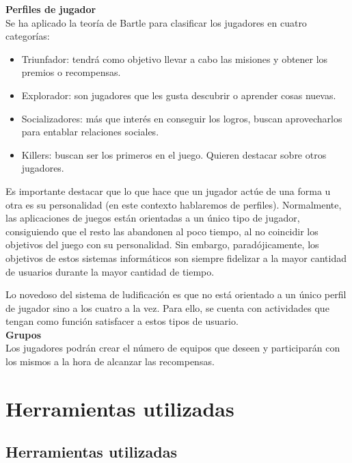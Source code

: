 \documentclass[twoside]{report}
\begin{document}
\textbf{Perfiles de jugador\cite{iebsctj}}\\ 

Se ha aplicado la teoría de Bartle para clasificar los jugadores en cuatro categorías:
\begin{itemize}

\item Triunfador: tendrá como objetivo llevar a cabo las misiones y obtener los premios o recompensas.
\item Explorador: son jugadores que les gusta descubrir o aprender cosas nuevas.
\item Socializadores: más que interés en conseguir los logros, buscan aprovecharlos para entablar relaciones sociales.
\item Killers: buscan ser los primeros en el juego. Quieren destacar sobre otros jugadores.

\end{itemize}

Es importante destacar que lo que hace que un jugador actúe de una forma u otra es su personalidad (en este contexto hablaremos de perfiles). Normalmente, las aplicaciones de juegos están orientadas a un único tipo de jugador, consiguiendo que el resto las abandonen al poco tiempo, al no coincidir los objetivos del juego con su personalidad. Sin embargo, paradójicamente, los objetivos de estos sistemas informáticos son siempre fidelizar a la mayor cantidad de usuarios durante la mayor cantidad de tiempo.

Lo novedoso del sistema de ludificación es que no está orientado a un único perfil de jugador sino a los cuatro a la vez. Para ello, se cuenta con actividades que tengan como función satisfacer a estos tipos de usuario. \\

\textbf{Grupos}\\

Los jugadores podrán crear el número de equipos que deseen y participarán con los mismos a la hora de alcanzar las recompensas.

\chapter{Herramientas utilizadas}
\section{Herramientas utilizadas}
\end{document}

